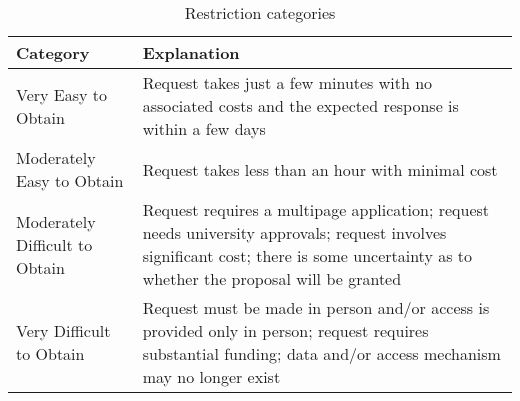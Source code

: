\begin{table}[h]
\centering
\caption{Restriction categories} 
\label{tab:categories}
\begin{tabular}{lp{5in}}
  \toprule
Category & Explanation \\ 
  \midrule
Very Easy to Obtain & Request takes just a few minutes with no associated costs and the expected response is within a few days \\ 
  Moderately Easy to Obtain & Request takes less than an hour with minimal cost \\ 
  Moderately Difficult to Obtain & Request requires a multipage application; request needs university approvals; request involves significant cost; there is some uncertainty as to whether the proposal will be granted \\ 
  Very Difficult to Obtain & Request must be made in person and/or access is provided only in person; request requires substantial funding; data and/or access mechanism may no longer exist \\ 
   \bottomrule
\end{tabular}
\end{table}
